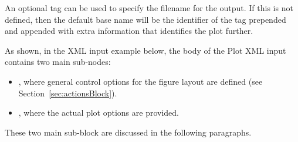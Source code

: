 An optional tag  can be used to specify the filename for
the output. If this is not defined, then the default base name will be the
 identifier of the tag prepended and appended with extra
information that identifies the plot further.

As shown, in the XML input example below, the body of the Plot XML input
contains two main sub-nodes:
\vspace{-5mm}
\begin{itemize}
  \itemsep0em
  \item {}, where general control options for the figure layout
  are defined (see Section~\ref{sec:actionsBlock}).
  \item {}, where the actual plot options are provided.
  \vspace{-5mm}
\end{itemize}

These two main sub-block are discussed in the following paragraphs.
%
